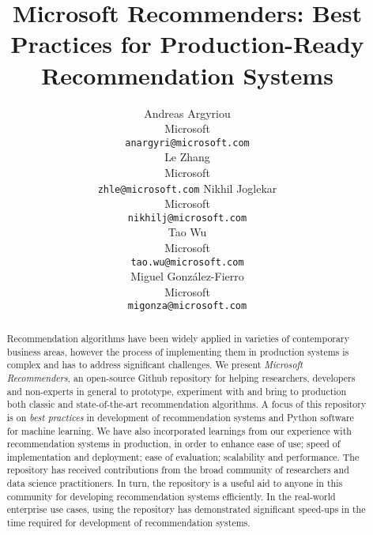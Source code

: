 \documentclass{article}
\title{Microsoft Recommenders: Best Practices for Production-Ready Recommendation Systems}
\author{%
  Andreas Argyriou \\
Microsoft \\ %
  \texttt{anargyri@microsoft.com} \\
\And
  Le Zhang \\
Microsoft \\ %
  \texttt{zhle@microsoft.com} 
\And
  Nikhil Joglekar \\
Microsoft  \\ %
  \texttt{nikhilj@microsoft.com} \\
\And
  Tao Wu \\
Microsoft \\ %
  \texttt{tao.wu@microsoft.com} \\
\And
  Miguel Gonz{\'a}lez-Fierro \\
Microsoft \\ %
  \texttt{migonza@microsoft.com} \\
}
\begin{document}
\maketitle

\begin{abstract}
Recommendation algorithms have been widely applied in varieties of contemporary business areas, however the process of implementing them in production 
systems is complex and has to address significant challenges. We present {\em Microsoft Recommenders},  
an open-source Github repository for helping researchers, developers and non-experts in general to prototype, experiment with and
bring to production both classic and state-of-the-art recommendation algorithms.
A focus of this repository is on {\em best practices} in development of recommendation systems and Python software for machine learning.
We have also incorporated learnings from our experience with recommendation systems in production, in order to enhance ease of use; speed of 
implementation and deployment; ease of evaluation; scalability and performance. 
The repository has received contributions from the broad community of researchers and data science practitioners. 
In turn, the repository is a useful aid to anyone in this community for developing recommendation systems efficiently.
In the real-world enterprise use cases, using the repository has demonstrated significant speed-ups in the time required for development of recommendation systems. 
\end{abstract}






%
%
% 
%
%
%














\end{document}
